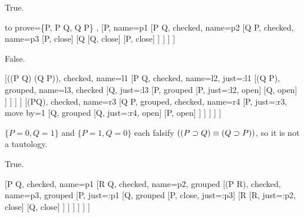 \begin{earg}

\item True.

	\begin{prooftree}
	{
	to prove={\{P, P \eif Q, Q \eif \enot P\} \vdash{}\bot},
	}
	[P, name=p1
	[P \eif Q, checked, name=p2
	[Q \eif \enot P, checked, name=p3
		[\enot P, close]
		[Q
			[\enot Q, close]
			[\enot P, close]
		]
	]
	]
	]
	\end{prooftree}

\item False.

	\begin{prooftree}
	{
	}
	[\enot((P \eif Q) \eiff (Q \eif P)), checked, name=l1
		[P \eif Q, checked, name=l2, just={\enot \eiff}:l1
			[\enot (Q \eif P), grouped, name=l3, checked 
				[Q, just={\enot \eif}:l3
				[\enot P, grouped
					[\enot P, just={\eif}:l2, open]
					[Q, open]
				]
				]
			]
		]
		[\enot (P\eif Q), checked, name=r3
		[Q \eif P, grouped, checked, name=r4
			[P, just={\enot \eif}:r3, move by=1
			[\enot Q, grouped
				[\enot Q, just={\eif}:r4, open]
				[P, open]
			]
			]
		]
		]
	]
	\end{prooftree}

$\{P=0, Q=1\}$ and $\{P=1, Q=0\}$ each falsify $((P \supset Q) \equiv (Q \supset P))$, so it is not a tautology.



\item True.

	\begin{prooftree}
	{
	}
	[P \eand Q, checked, name=p1
	[\enot R \eif \enot Q, checked, name=p2, grouped
	[\enot (P \eand R), checked, name=p3, grouped
		[P, just={\eand}:p1
		[Q, grouped
			[\enot P, close, just={\enot \eand}:p3]
			[\enot R
				[\enot \enot R, just={\eif}:p2, close]
				[\enot Q, close]
			]
		]
		]
	]
	]
	]
	\end{prooftree}
	




\end{earg}
